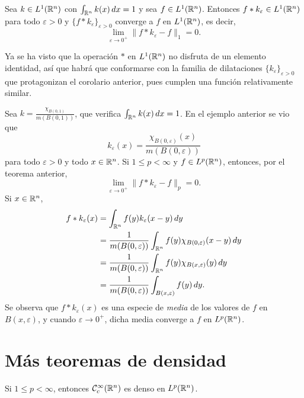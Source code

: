 \documentclass[a4paper, 11pt, oneside]{report}
\begin{document}
\begin{corollary}\label{cor:2.3.6}
  Sea $k \in L^1(\mathbb R^n)$ con $\int_{\mathbb R^n} k(x) \, dx = 1$ y sea $f \in L^1(\mathbb R^n)$. Entonces $f \ast k_\varepsilon \in L^1(\mathbb R^n)$ para todo $\varepsilon > 0$ y $\{f \ast k_\varepsilon\}_{\varepsilon > 0}$ converge a $f$ en $L^1(\mathbb R^n)$, es decir,
  \[\lim_{\varepsilon \to 0^+} \|f \ast k_\varepsilon - f\|_1 = 0.\]
\end{corollary}

Ya se ha visto que la operación $\ast$ en $L^1(\mathbb R^n)$ no disfruta de un elemento identidad, así que habrá que conformarse con la familia de dilataciones $\{k_\varepsilon\}_{\varepsilon > 0}$ que protagonizan el corolario anterior, pues cumplen una función relativamente similar.

\begin{example}
  Sea $k = \frac{\chi_{B(0,1)}}{m(B(0,1))}$, que verifica $\int_{\mathbb R^n}k(x) \, dx = 1$. En el ejemplo anterior se vio que
  \[k_\varepsilon(x) = \frac{\chi_{B(0,\varepsilon)}(x)}{m(B(0,\varepsilon))}\]
  para todo $\varepsilon > 0$ y todo $x \in \mathbb R^n$. Si $1 \leq p < \infty$ y $f \in L^p(\mathbb R^n)$, entonces, por el teorema anterior,
  \[\lim_{\varepsilon \to 0^+} \|f \ast k_\varepsilon - f\|_p = 0.\]
  Si $x \in \mathbb R^n$,
  \[\begin{aligned}[t]
    f \ast k_\varepsilon(x) &= \int_{\mathbb R^n} f(y) k_\varepsilon(x-y) \, dy \\
    &=\frac{1}{m(B(0,\varepsilon))} \int_{\mathbb R^n} f(y) \chi_{B(0,\varepsilon)}(x-y) \, dy \\
    &=\frac{1}{m(B(0,\varepsilon))} \int_{\mathbb R^n} f(y) \chi_{B(x,\varepsilon)}(y) \, dy \\
    &= \frac{1}{m(B(0,\varepsilon))} \int_{B(x,\varepsilon)} f(y) \, dy.
  \end{aligned}\]
  Se observa que $f \ast k_\varepsilon(x)$ es una especie de \emph{media} de los valores de $f$ en $B(x,\varepsilon)$, y cuando $\varepsilon \to 0^+$, dicha media converge a $f$ en $L^p(\mathbb R^n)$. 
\end{example}

\section{Más teoremas de densidad}

\begin{theorem}
  Si $1 \leq p < \infty$, entonces $\mathcal{C}^\infty_c(\mathbb R^n)$ es denso en $L^p(\mathbb R^n)$.
\end{theorem}
\end{document}
